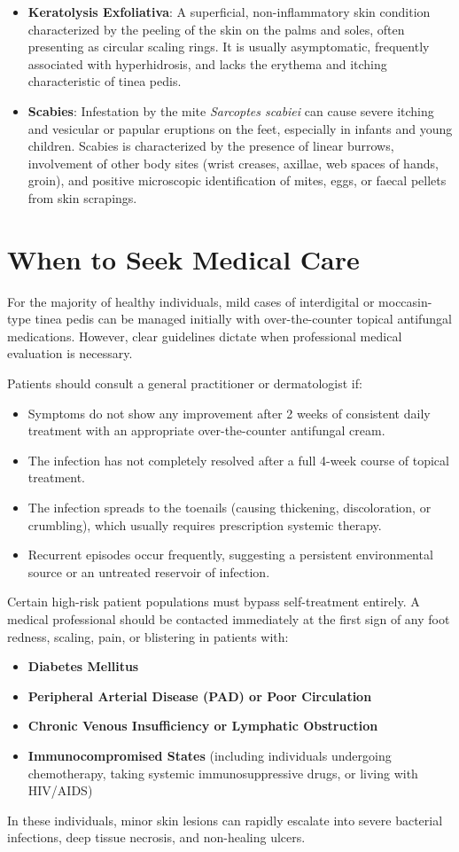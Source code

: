 \begin{itemize}
    \item \textbf{Keratolysis Exfoliativa}: A superficial, non-inflammatory skin condition characterized by the peeling of the skin on the palms and soles, often presenting as circular scaling rings. It is usually asymptomatic, frequently associated with hyperhidrosis, and lacks the erythema and itching characteristic of tinea pedis.
    \item \textbf{Scabies}: Infestation by the mite \textit{Sarcoptes scabiei} can cause severe itching and vesicular or papular eruptions on the feet, especially in infants and young children. Scabies is characterized by the presence of linear burrows, involvement of other body sites (wrist creases, axillae, web spaces of hands, groin), and positive microscopic identification of mites, eggs, or faecal pellets from skin scrapings.
\end{itemize}

\section*{When to Seek Medical Care}
For the majority of healthy individuals, mild cases of interdigital or moccasin-type tinea pedis can be managed initially with over-the-counter topical antifungal medications. However, clear guidelines dictate when professional medical evaluation is necessary.

Patients should consult a general practitioner or dermatologist if:
\begin{itemize}
    \item Symptoms do not show any improvement after 2 weeks of consistent daily treatment with an appropriate over-the-counter antifungal cream.
    \item The infection has not completely resolved after a full 4-week course of topical treatment.
    \item The infection spreads to the toenails (causing thickening, discoloration, or crumbling), which usually requires prescription systemic therapy.
    \item Recurrent episodes occur frequently, suggesting a persistent environmental source or an untreated reservoir of infection.
\end{itemize}

Certain high-risk patient populations must bypass self-treatment entirely. A medical professional should be contacted immediately at the first sign of any foot redness, scaling, pain, or blistering in patients with:
\begin{itemize}
    \item \textbf{Diabetes Mellitus}
    \item \textbf{Peripheral Arterial Disease (PAD) or Poor Circulation}
    \item \textbf{Chronic Venous Insufficiency or Lymphatic Obstruction}
    \item \textbf{Immunocompromised States} (including individuals undergoing chemotherapy, taking systemic immunosuppressive drugs, or living with HIV/AIDS)
\end{itemize}
In these individuals, minor skin lesions can rapidly escalate into severe bacterial infections, deep tissue necrosis, and non-healing ulcers.

